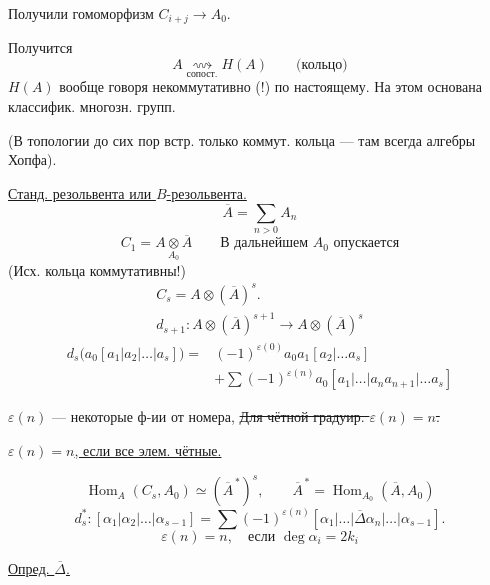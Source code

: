 Получили гомоморфизм $C_{i+j}\longrightarrow A_0$.


Получится
\[
A\underset{\text{сопост.}}{\rightsquigarrow}H(A)
\qquad\text{(кольцо)}
\]
$H(A)$ вообще говоря некоммутативно (!) по настоящему.
На этом основана классифик. многозн. групп.

(В топологии до сих пор встр. только коммут. кольца — там всегда алгебры Хопфа).

\uline{Станд. резольвента или \mbox{$B$}-резольвента.}
\[
\overline A=\sum_{n>0}A_n
\]
\[
C_1=A\underset{A_0}{\otimes}\overline A
\qquad\text{В дальнейшем }A_0\text{ опускается}
\]
(Исх. кольца коммутативны!)
\[
\begin{gathered}
C_s=A\otimes(\overline A)^s.\\
d_{s+1}\colon A\otimes(\overline A)^{s+1}
\longrightarrow A\otimes(\overline A)^s
\end{gathered}
\]
\[
\begin{aligned}
d_s\bigl(a_0[a_1|a_2|\ldots|a_s]\bigr)
={}&(-1)^{\varepsilon(0)}a_0a_1[a_2|\ldots a_s]\\
 &+\sum(-1)^{\varepsilon(n)}a_0[a_1|\ldots|a_na_{n+1}|\ldots a_s]
\end{aligned}
\]


$\varepsilon(n)$ — некоторые ф-ии от номера,
\sout{Для чётной градуир. \mbox{$\varepsilon(n)=n$}.}
\par\uline{\mbox{$\varepsilon(n)=n$}, если все элем. чётные.}


\[
\operatorname{Hom}_A(C_s,A_0)\simeq(\overline A^{\,*})^s,
\qquad \overline A^{\,*}=\operatorname{Hom}_{A_0}(\overline A,A_0)
\]
\[
d_s^*\colon[\alpha_1|\alpha_2|\ldots|\alpha_{s-1}]
=\sum(-1)^{\varepsilon(n)}
[\alpha_1|\ldots|\overline\Delta\alpha_n|\ldots|\alpha_{s-1}].
\]
\[
\varepsilon(n)=n,\quad\text{если }\deg\alpha_i=2k_i
\]

\uline{Опред. \mbox{$\overline\Delta$}.}


